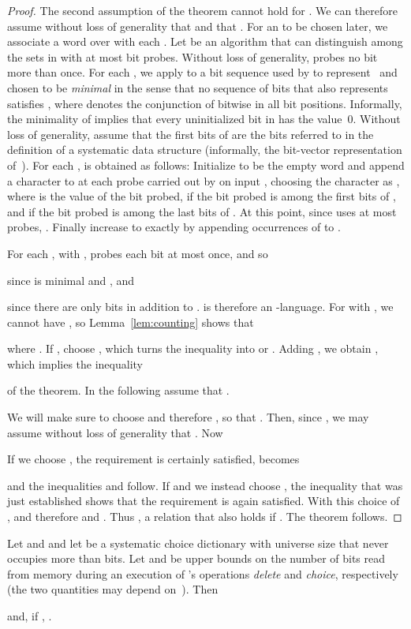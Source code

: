 \documentclass[envcountsame,envcountsect,undated,nolinenumbers]{lnthi}
\def\Tvn#1{\hbox{\textit{#1\/}}}
\begin{document}
\begin{proof}
The second assumption of the theorem
cannot hold for .
We can therefore assume without loss
of generality that  and that .
For an  to be chosen later,
we associate a word  over
 with each
.
Let  be an algorithm that can
distinguish among the sets in 
with at most  bit probes.
Without loss of generality, 
probes no bit more than once.
For each , we apply 
to a bit sequence  used by  to represent~
and chosen to be \emph{minimal} in the sense
that no sequence  of  bits
that also represents  satisfies ,
where  denotes the conjunction of
bitwise  in all bit positions.
Informally, the minimality of  implies
that every uninitialized bit in 
has the value~0.
Without loss of generality, assume that the first
 bits of  are the bits 
referred to in the definition of a systematic
data structure (informally, the bit-vector
representation of~).
For each ,  is obtained as follows:
Initialize  to be the empty word
and append a character to 
at each probe carried out by 
on input , choosing the character as ,
where  is the value of the bit
probed,  if the bit probed is
among the first  bits of , and 
 if the bit probed is
among the last  bits of .
At this point, since  uses at
most  probes, .
Finally increase  to exactly  
by appending  occurrences of  to .

For each
, with ,
 probes each bit at most once, and so

since  is minimal and , and

since there are only  bits in addition
to .
 is therefore an
-language.
For  with ,
we cannot have , so
Lemma~\ref{lem:counting} shows that

where .
If , choose , which turns the inequality  into
 or .
Adding , we obtain , which implies the inequality

of the theorem.
In the following assume that .

We will make sure to choose
 and therefore ,
so that .
Then, since , we may assume
without loss of generality that .
Now

If we choose , the requirement 
is certainly satisfied,  becomes

and the inequalities 
and  follow.
If  and we instead choose
,
the inequality  that was just
established shows that the requirement
 is again satisfied.
With this choice of ,
 and therefore
 and .
Thus ,
a relation that also holds if .
The theorem follows.
\end{proof}

\begin{corollary}
Let  and  and let  be a systematic
choice dictionary with universe size  that
never occupies more than  bits.
Let  and 
be upper bounds on the number of bits read from
memory during an execution of 's operations
\Tvn{delete} and \Tvn{choice}, respectively
(the two quantities may depend on~).
Then

and, if ,
.
\end{corollary}
\end{document}
